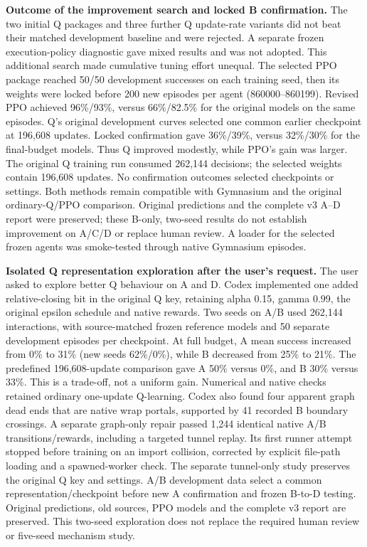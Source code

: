 \medskip
\noindent\textbf{Outcome of the improvement search and locked B confirmation.}
The two initial Q packages and three further Q update-rate variants did not
beat their matched development baseline and were rejected. A separate frozen
execution-policy diagnostic gave mixed results and was not adopted. This
additional search made cumulative tuning effort unequal. The selected PPO
package reached 50/50 development successes on each training seed, then its
weights were locked before 200 new episodes per agent (860000--860199).
Revised PPO achieved 96\%/93\%, versus 66\%/82.5\% for the original models on
the same episodes. Q's original development curves selected one common earlier
checkpoint at 196,608 updates. Locked confirmation gave 36\%/39\%, versus
32\%/30\% for the final-budget models. Thus Q improved modestly, while PPO's
gain was larger. The original Q training run consumed 262,144 decisions;
the selected weights contain 196,608 updates. No confirmation outcomes selected
checkpoints or settings. Both methods remain compatible with Gymnasium and
the original ordinary-Q/PPO comparison. Original predictions and the complete
v3 A--D report were preserved; these B-only, two-seed results do not establish
improvement on A/C/D or replace human review. A loader for the selected frozen
agents was smoke-tested through native Gymnasium episodes.

\medskip
\noindent\textbf{Isolated Q representation exploration after the user's request.}
The user asked to explore better Q behaviour on A and D. Codex implemented
one added relative-closing bit in the original Q key, retaining alpha 0.15,
gamma 0.99, the original epsilon schedule and native rewards. Two seeds on
A/B used 262,144 interactions, with source-matched frozen reference models
and 50 separate development episodes per checkpoint. At full budget, A mean
success increased from 0\% to 31\% (new seeds 62\%/0\%), while B decreased
from 25\% to 21\%. The predefined 196,608-update comparison gave A 50\%
versus 0\%, and B 30\% versus 33\%. This is a trade-off, not a uniform gain.
Numerical and native checks retained ordinary one-update Q-learning.
Codex also found four apparent graph dead ends that are native wrap portals,
supported by 41 recorded B boundary crossings. A separate graph-only repair
passed 1,244 identical native A/B transitions/rewards, including a targeted
tunnel replay. Its first runner attempt stopped before training on an import
collision, corrected by explicit file-path loading and a spawned-worker check.
The separate tunnel-only study preserves the original Q key and settings.
A/B development data select a common representation/checkpoint before new
A confirmation and frozen B-to-D testing. Original predictions, old sources,
PPO models and the complete v3 report are preserved. This two-seed exploration
does not replace the required human review or five-seed mechanism study.


